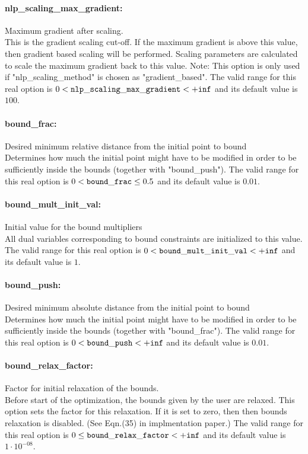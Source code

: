 \documentclass[letter,10pt]{article}
\begin{document}
\paragraph{nlp\_scaling\_max\_gradient:} Maximum gradient after scaling. $\;$ \\
 This is the gradient scaling cut-off. If the
maximum gradient is above this value, then
gradient based scaling will be performed. Scaling
parameters are calculated to scale the maximum
gradient back to this value. Note: This option is
only used if "nlp\_scaling\_method" is chosen as
"gradient\_based". The valid range for this real option is 
$0 <  {\tt nlp\_scaling\_max\_gradient } <  {\tt +inf}$
and its default value is $100$.


\paragraph{bound\_frac:} Desired minimum relative distance from the initial point to bound $\;$ \\
 Determines how much the initial point might have
to be modified in order to be sufficiently inside
the bounds (together with "bound\_push"). The valid range for this real option is 
$0 <  {\tt bound\_frac } \le 0.5$
and its default value is $0.01$.


\paragraph{bound\_mult\_init\_val:} Initial value for the bound multipliers $\;$ \\
 All dual variables corresponding to bound
constraints are initialized to this value. The valid range for this real option is 
$0 <  {\tt bound\_mult\_init\_val } <  {\tt +inf}$
and its default value is $1$.


\paragraph{bound\_push:} Desired minimum absolute distance from the initial point to bound $\;$ \\
 Determines how much the initial point might have
to be modified in order to be sufficiently inside
the bounds (together with "bound\_frac"). The valid range for this real option is 
$0 <  {\tt bound\_push } <  {\tt +inf}$
and its default value is $0.01$.


\paragraph{bound\_relax\_factor:} Factor for initial relaxation of the bounds. $\;$ \\
 Before start of the optimization, the bounds
given by the user are relaxed.  This option sets
the factor for this relaxation.  If it is set to
zero, then then bounds relaxation is disabled.
(See Eqn.(35) in implmentation paper.) The valid range for this real option is 
$0 \le {\tt bound\_relax\_factor } <  {\tt +inf}$
and its default value is $1 \cdot 10^{-08}$.
\end{document}
